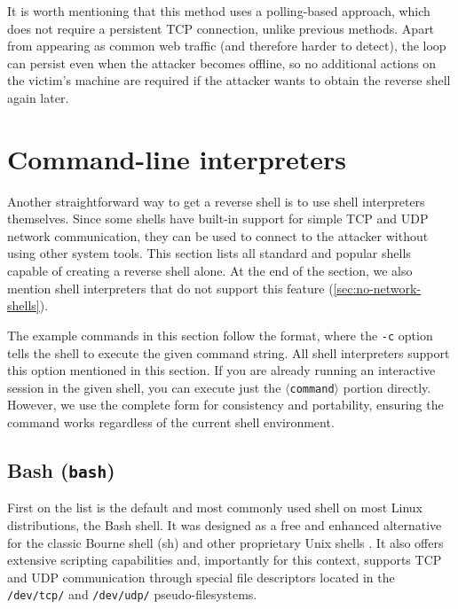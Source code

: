 It is worth mentioning that this method uses a polling-based approach, which does not require a persistent TCP connection, unlike previous methods. Apart from appearing as common web traffic (and therefore harder to detect), the loop can persist even when the attacker becomes offline, so no additional actions on the victim's machine are required if the attacker wants to obtain the reverse shell again later.


\section{Command-line interpreters}

Another straightforward way to get a reverse shell is to use shell interpreters themselves. Since some shells have built-in support for simple TCP and UDP network communication, they can be used to connect to the attacker without using other system tools. This section lists all standard and popular shells capable of creating a reverse shell alone. At the end of the section, we also mention shell interpreters that do not support this feature (\cref{sec:no-network-shells}).

The example commands in this section follow the  format, where the \texttt{-c} option tells the shell to execute the given command string. All shell interpreters support this option mentioned in this section. If you are already running an interactive session in the given shell, you can execute just the \texttt{\textcolor{placeholder}{$\langle$command$\rangle$}} portion directly. However, we use the complete form for consistency and portability, ensuring the command works regardless of the current shell environment.


\subsection{Bash (\texttt{bash})}


First on the list is the default and most commonly used shell on most Linux distributions, the Bash shell. It was designed as a free and enhanced alternative for the classic Bourne shell (sh) and other proprietary Unix shells \cite{gnu-about}. It also offers extensive scripting capabilities and, importantly for this context, supports TCP and UDP communication through special file descriptors located in the \texttt{/dev/tcp/} and \texttt{/dev/udp/} pseudo-filesystems.

